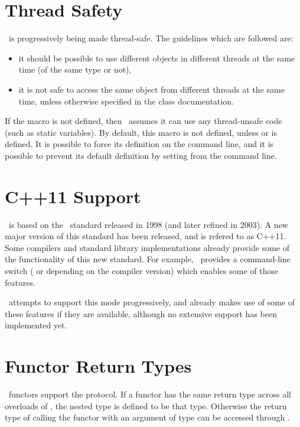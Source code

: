 \section{Thread Safety}

\cgal\ is progressively being made thread-safe.  The guidelines which are followed
are:
\begin{itemize}
\item it should be possible to use different objects in different threads at
the same time (of the same type or not),
\item it is not safe to access the same object from different threads
at the same time, unless otherwise specified in the class documentation.
\end{itemize}

If the macro  is not defined, then \cgal\ assumes it can use
any thread-unsafe code (such as static variables).  By default, this macro is not
defined, unless  or  is defined.  It is possible
to force its definition on the command line, and it is possible to prevent its default
definition by setting  from the command line.


\section{C++11 Support}

\cgal\ is based on the \CC\ standard released in 1998 (and later refined in 2003).
A new major version of this standard has been released, and is refered to as C++11.
Some compilers and standard library implementations already provide some of the
functionality of this new standard.  For example, \gcc\ provides
a command-line switch (  or  depending on the compiler version)
which enables some of those features.

\cgal\ attempts to support this mode progressively, and already makes use of
some of these features if they are available, although no extensive support has
been implemented yet.

\section{Functor Return Types}

\cgal\ functors support the
protocol. If a functor  has the same return type across all
overloads of , the nested type
 is defined to be that type. Otherwise the
return type of calling the functor with an argument of type
 can be accessed through
.

